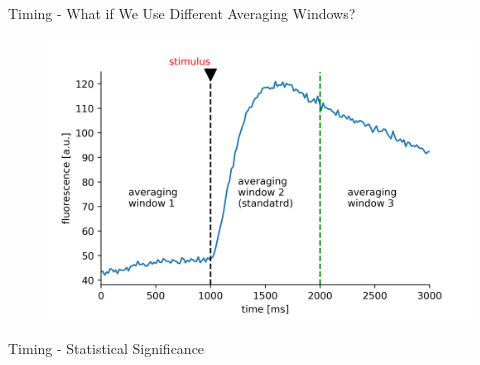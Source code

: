 \documentclass[10pt]{beamer}
\begin{document}
\begin{frame}[fragile]{Timing - What if We Use Different Averaging Windows?}
\begin{center}
	\begin{figure}
      \includegraphics[width=1.0\textwidth]{timing_exp.png}
	\end{figure}
	\end{center}
\end{frame}

\begin{frame}[fragile]{Timing - Statistical Significance}
\begin{center}
	\end{center}
\end{frame}
\end{document}
